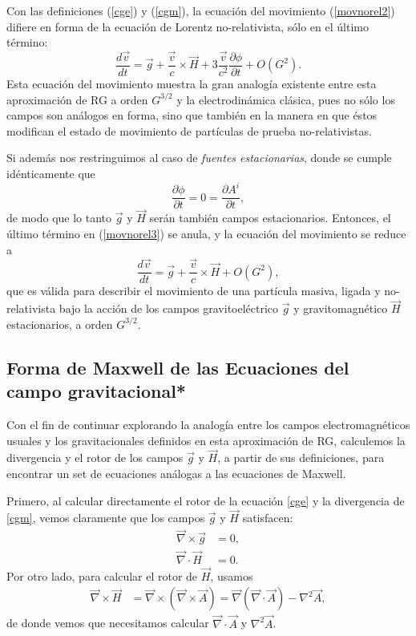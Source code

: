 Con las definiciones (\ref{cge}) y (\ref{cgm}), la ecuación del movimiento (\ref{movnorel2}) difiere en forma de la ecuación de Lorentz no-relativista, sólo en el último término:
\begin{equation}
\frac{d\vec{v}}{dt}=\vec{g}+\frac{\vec{v}}{c}\times\vec{H}+3\frac{\vec{v}}{c^2}\frac{\partial \phi}{\partial t}+O\left(G^2\right).\label{movnorel3}
\end{equation}
Esta ecuación del movimiento muestra la gran analogía existente entre esta aproximación de RG a orden $G^{3/2}$ y la electrodinámica clásica, pues no sólo los campos son análogos en forma, sino que también en la manera en que éstos modifican el estado de movimiento de partículas de prueba no-relativistas.

Si además nos restringuimos al caso de \textit{fuentes estacionarias}, donde se cumple idénticamente que
\begin{equation}
\frac{\partial\phi}{\partial t}=0=\frac{\partial A^i}{\partial t},
\end{equation}
de modo que lo tanto $\vec{g}$ y $\vec{H}$ serán también campos estacionarios. Entonces, el último término en (\ref{movnorel3}) se anula, y la ecuación del movimiento se reduce a
\begin{equation}\boxed{
\frac{d\vec{v}}{dt}=\vec{g}+\frac{\vec{v}}{c}\times\vec{H}+O\left(G^2\right),}\label{movnorel4}
\end{equation}
que es válida para describir el movimiento de una partícula masiva, ligada y no-relativista bajo la acción de los campos gravitoeléctrico $\vec{g}$ y gravitomagnético $\vec{H}$ estacionarios, a orden $G^{3/2}$.

\subsection{Forma de Maxwell de las Ecuaciones del campo gravitacional*}

Con el fin de continuar explorando la analogía entre los campos electromagnéticos usuales y los gravitacionales definidos en esta aproximación de RG, calculemos la divergencia y el rotor de los campos $\vec{g}$ y $\vec{H}$, a partir de sus definiciones, para encontrar un set de ecuaciones análogas a las ecuaciones de Maxwell.

Primero, al calcular directamente el rotor de la ecuación \eqref{cge} y la divergencia de \eqref{cgm}, vemos claramente que los campos $\vec{g}$ y $\vec{H}$ satisfacen:
\begin{align}
\vec{\nabla}\times\vec{g} &= 0,\\
\vec{\nabla}\cdot\vec{H} &= 0.
\end{align}
Por otro lado, para calcular el rotor de $\vec{H}$, usamos
\begin{align}
\vec{\nabla}\times\vec{H} &= \vec{\nabla}\times(\vec{\nabla}\times\vec{A})= \vec{\nabla}(\vec{\nabla}\cdot\vec{A})-{\nabla}^2\vec{A},\label{rotorhcasi}
\end{align}
de donde vemos que necesitamos calcular $\vec{\nabla}\cdot\vec{A}$ y ${\nabla}^2\vec{A}$.

